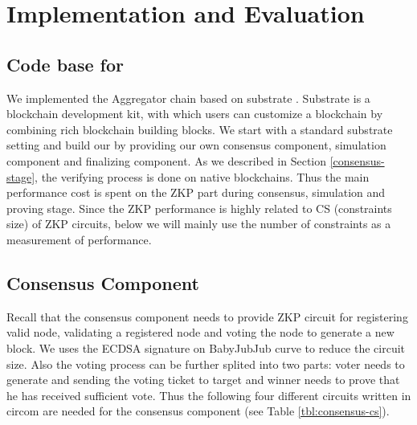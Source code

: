 \section{Implementation and Evaluation}
\label{chp:bench}
\subsection{Code base for \dprotocol}
We implemented the Aggregator chain based on substrate \cite{substrate}. Substrate is a blockchain development kit, with which users can customize a blockchain by combining rich blockchain building blocks. We start with a standard substrate setting and build our \dprotocol by providing our own consensus component, simulation component and finalizing component. As we described in Section \ref{consensus-stage}, the verifying process is done on native blockchains. Thus the main performance cost is spent on the ZKP part during consensus, simulation and proving stage. Since the ZKP performance is highly related to CS (constraints size) of ZKP circuits, below we will mainly use the number of constraints as a measurement of performance. 

\subsection {Consensus Component}
Recall that the consensus component needs to provide ZKP circuit for registering valid node, validating a registered node and voting the node to generate a new block. We uses the ECDSA signature on BabyJubJub \cite{whitehat2020baby} curve to reduce the circuit size. Also the voting process can be further splited into two parts: voter needs to generate and sending the voting ticket to target and winner needs to prove that he has received sufficient vote.  Thus the following four different circuits written in circom \cite{munoz2022circom} are needed for the consensus component (see Table \ref{tbl:consensus-cs}).


